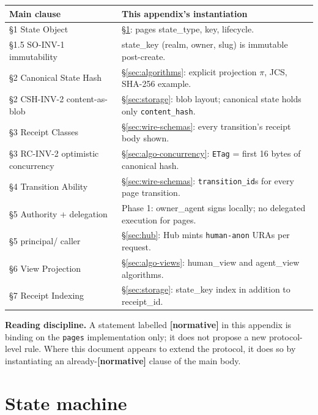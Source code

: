 \documentclass[11pt,a4paper]{article}
\newcommand{\normsv}{\textcolor{normativecolor}{\textbf{[normative]}}\xspace}
\theoremstyle{definition}
\begin{document}
\begin{center}
\renewcommand{\arraystretch}{1.2}
\begin{tabularx}{\linewidth}{l X}
\toprule
\textbf{Main clause} & \textbf{This appendix's instantiation} \\
\midrule
\S1 State Object               & \S\ref{sec:state-machine}: pages state\_type, key, lifecycle. \\
\S1.5 SO-INV-1 immutability    & state\_key (realm, owner, slug) is immutable post-create. \\
\S2 Canonical State Hash       & \S\ref{sec:algorithms}: explicit projection $\pi$, JCS, SHA-256 example. \\
\S2 CSH-INV-2 content-as-blob  & \S\ref{sec:storage}: blob layout; canonical state holds only \texttt{content\_hash}. \\
\S3 Receipt Classes            & \S\ref{sec:wire-schemas}: every transition's receipt body shown. \\
\S3 RC-INV-2 optimistic concurrency & \S\ref{sec:algo-concurrency}: \texttt{ETag} = first 16 bytes of canonical hash. \\
\S4 Transition Ability         & \S\ref{sec:wire-schemas}: \texttt{transition\_id}s for every page transition. \\
\S5 Authority + delegation     & Phase 1: owner\_agent signs locally; no delegated execution for pages. \\
\S5 principal/ caller          & \S\ref{sec:hub}: Hub mints \texttt{human-anon} URAs per request. \\
\S6 View Projection            & \S\ref{sec:algo-views}: human\_view and agent\_view algorithms. \\
\S7 Receipt Indexing           & \S\ref{sec:storage}: state\_key index in addition to receipt\_id. \\
\bottomrule
\end{tabularx}
\end{center}

\textbf{Reading discipline.} A statement labelled \normsv{} in this
appendix is binding on the \texttt{pages} implementation only; it
does not propose a new protocol-level rule. Where this document
appears to extend the protocol, it does so by instantiating an
already-\normsv{} clause of the main body.

\section{State machine}
\label{sec:state-machine}
\end{document}
